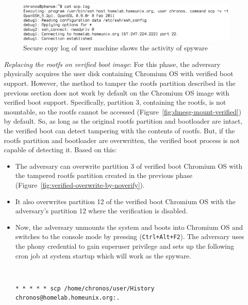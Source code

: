 \documentclass[11pt]{article}
\begin{document}
\begin{enumerate}
\begin{figure}[htbp]
  \centering
    \includegraphics[scale=.25]{Figure/transfer-log.eps}
\caption{\small{Secure copy log of user machine shows the activity of spyware}}
\label{fig:transfer-log}
\end{figure}
\emph{Replacing the rootfs on verified boot image}: For this phase, the adversary physically acquires the user disk containing Chromium OS with verified boot support. However, the method to tamper the rootfs partition described in the previous section does not work by default on the Chromium OS image with verified boot support. Specifically, partition 3, containing the rootfs, is not mountable, so the rootfs cannot be accessed (Figure~\ref{fig:dmesg-mount-verified}) by default. So, as long as the original rootfs partition and bootloader are intact, the verified boot can detect tampering with the contents of rootfs. But, if the rootfs partition and bootloader are overwritten, the verified boot process is not capable of detecting it. Based on this:
\begin{itemize}
\item The adversary can overwrite partition 3 of verified boot Chromium OS with the tampered rootfs partition created in the previous phase (Figure~\ref{fig:verified-overwrite-by-noverify}).

\item It also overwrites partition 12 of the verified boot Chromium OS with the adversary's partition 12 where the verification is disabled.
 
\item Now, the adversary unmounts the system and boots into Chromium OS and switches to the console mode by pressing (\texttt{Ctrl+Alt+F2}). The adversary uses the phony credential to gain superuser privilege and sets up the following cron job at system startup which will work as the spyware. 

{\tt \small
\begin{verbatim}
* * * * * scp /home/chronos/user/History 
chronos@homelab.homeunix.org:.
\end{verbatim}
}


\end{itemize}
\end{enumerate}
\end{document}

